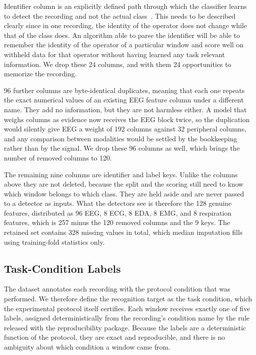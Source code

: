 \documentclass[a4paper,twoside]{article}
\begin{document}
Identifier column is an explicitly defined path through which the classifier learns to detect the recording and not the actual class~\cite{brookshire2024leakage}. This needs to be described clearly since in one recording, the identity of the operator does not change while that of the class does. An algorithm able to parse the identifier will be able to remember the identity of the operator of a particular window and score well on withheld data for that operator without having learned any task relevant information. We drop these 24 columns, and with them 24 opportunities to memorize the recording.

96 further columns are byte-identical duplicates, meaning that each one repeats the exact numerical values of an existing \ac{EEG} feature column under a different name. They add no information, but they are not harmless either. A model that weighs columns as evidence now receives the \ac{EEG} block twice, so the duplication would silently give \ac{EEG} a weight of 192 columns against 32 peripheral columns, and any comparison between modalities would be settled by the bookkeeping rather than by the signal. We drop these 96 columns as well, which brings the number of removed columns to 120.

The remaining nine columns are identifier and label keys. Unlike the columns above they are not deleted, because the split and the scoring still need to know which window belongs to which class. They are held aside and are never passed to a detector as inputs. What the detectors see is therefore the 128 genuine features, distributed as 96 \ac{EEG}, 8 \ac{ECG}, 8 \ac{EDA}, 8 \ac{EMG}, and 8 respiration features, which is 257 minus the 120 removed columns and the 9 keys. The retained set contains 328 missing values in total, which median imputation fills using training-fold statistics only.

\subsection{Task-Condition Labels}

\noindent The dataset annotates each recording with the protocol condition that was performed. We therefore define the recognition target as the task condition, which the experimental protocol itself certifies. Each window receives exactly one of five labels, assigned deterministically from the recording's condition name by the rule released with the reproducibility package. Because the labels are a deterministic function of the protocol, they are exact and reproducible, and there is no ambiguity about which condition a window came from.
\end{document}
